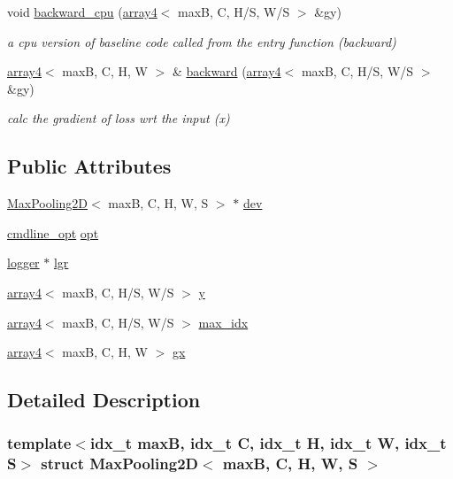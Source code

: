 \begin{DoxyCompactItemize}
void \hyperlink{structMaxPooling2D_a28487a560998c1eb511f3d4e3b948fd6}{backward\+\_\+cpu} (\hyperlink{structarray4}{array4}$<$ maxB, C, H/S, W/S $>$ \&gy)
\begin{DoxyCompactList}\small\item\em a cpu version of baseline code called from the entry function (backward) \end{DoxyCompactList}\item 
\hyperlink{structarray4}{array4}$<$ maxB, C, H, W $>$ \& \hyperlink{structMaxPooling2D_ae0ad0f868dcf5f976f4dd99dd91e2f91}{backward} (\hyperlink{structarray4}{array4}$<$ maxB, C, H/S, W/S $>$ \&gy)
\begin{DoxyCompactList}\small\item\em calc the gradient of loss wrt the input (x) \end{DoxyCompactList}\end{DoxyCompactItemize}
\subsection*{Public Attributes}
\begin{DoxyCompactItemize}
\item 
\hyperlink{structMaxPooling2D}{Max\+Pooling2D}$<$ maxB, C, H, W, S $>$ $\ast$ \hyperlink{structMaxPooling2D_ad21014604fa6abddbfdcdc0b64f37196}{dev}
\item 
\hyperlink{structcmdline__opt}{cmdline\+\_\+opt} \hyperlink{structMaxPooling2D_a573bf3df3ae3d9043763c6743f1b87f9}{opt}
\item 
\hyperlink{structlogger}{logger} $\ast$ \hyperlink{structMaxPooling2D_a516ea469a544d99543c9073bc318f970}{lgr}
\item 
\hyperlink{structarray4}{array4}$<$ maxB, C, H/S, W/S $>$ \hyperlink{structMaxPooling2D_a0ad5375e31a495c53600f3367da9fddc}{y}
\item 
\hyperlink{structarray4}{array4}$<$ maxB, C, H/S, W/S $>$ \hyperlink{structMaxPooling2D_ac6ca7dc8ceca1e9e5d2403634ebd8802}{max\+\_\+idx}
\item 
\hyperlink{structarray4}{array4}$<$ maxB, C, H, W $>$ \hyperlink{structMaxPooling2D_abf5754c5b154e54b09c38bc2c189562b}{gx}
\end{DoxyCompactItemize}


\subsection{Detailed Description}
\subsubsection*{template$<$idx\+\_\+t maxB, idx\+\_\+t C, idx\+\_\+t H, idx\+\_\+t W, idx\+\_\+t S$>$\newline
struct Max\+Pooling2\+D$<$ max\+B, C, H, W, S $>$}

